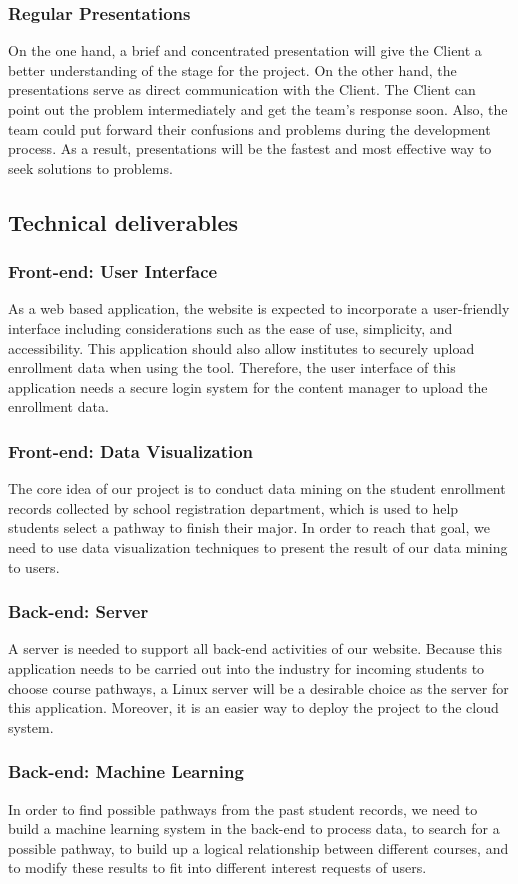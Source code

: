 \documentclass{article}
\begin{document}
\subsubsection{Regular Presentations}
On the one hand, a brief and concentrated presentation will give the Client a better understanding of the stage for the project. On the other hand, the presentations serve as direct communication with the Client. The Client can point out the problem intermediately and get the team’s response soon. Also, the team could put forward their confusions and problems during the development process. As a result, presentations will be the fastest and most effective way to seek solutions to problems.
\subsection{Technical deliverables}
\subsubsection{Front-end: User Interface}
As a web based application, the website is expected to incorporate a user-friendly interface including considerations such as the ease of use, simplicity, and accessibility. This application should also allow institutes to securely upload enrollment data when using the tool. Therefore, the user interface of this application needs a secure login system for the content manager to upload the enrollment data.
\subsubsection{Front-end: Data Visualization}
The core idea of our project is to conduct data mining on the student enrollment records collected by school registration department, which is used to help students select a pathway to finish their major. In order to reach that goal, we need to use data visualization techniques to present the result of our data mining to users.
\subsubsection{Back-end: Server}
A server is needed to support all back-end activities of our website. Because this application needs to be carried out into the industry for incoming students to choose course pathways, a Linux server will be a desirable choice as the server for this application. Moreover, it is an easier way to deploy the project to the cloud system.
\subsubsection{Back-end: Machine Learning}
In order to find possible pathways from the past student records, we need to build a machine learning system in the back-end to process data, to search for a possible pathway, to build up a logical relationship between different courses, and to modify these results to fit into different interest requests of users.
\end{document}
